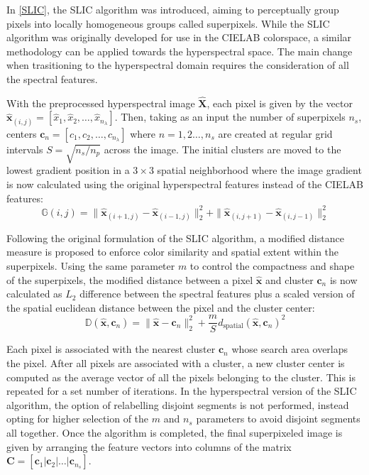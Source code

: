 In \ref{SLIC}, the SLIC algorithm was introduced, aiming to perceptually group pixels into locally homogeneous groups called superpixels. While the SLIC algorithm was originally developed for use in the CIELAB colorspace, a similar methodology can be applied towards the hyperspectral space. The main change when trasitioning to the hyperspectral domain requires the consideration of all the spectral features.

With the preprocessed hyperspectral image $\hat{\mathbf{X}}$, each pixel is given by the vector $\hat{\mathbf{x}}_{(i,j)} = [\hat{x}_1, \hat{x}_2, \dots, \hat{x}_{n_\lambda}]$. Then, taking as an input the number of superpixels $n_s$, centers $\mathbf{c}_n = [c_1, c_2, \dots, c_{n_\lambda}]$ where $n = 1, 2 \dots, n_s$ are created at regular grid intervals $S = \sqrt{n_s/n_p}$ across the image. The initial clusters are moved to the lowest gradient position in a $3 \times 3$ spatial neighborhood where the image gradient is now calculated using the original hyperspectral features instead of the CIELAB features: 
\begin{equation}
    \label{eq:slic-gradient-2}
    \mathbb{G}(i,j) = \|\hat{\mathbf{x}}_{(i+1,j)} - \hat{\mathbf{x}}_{(i-1,j)} \|_2^2 + \|\hat{\mathbf{x}}_{(i,j+1)} - \hat{\mathbf{x}}_{(i,j-1)} \|_2^2
\end{equation}

Following the original formulation of the SLIC algorithm, a modified distance measure is proposed to enforce color similarity and spatial extent within the superpixels. Using the same parameter $m$ to control the compactness and shape of the superpixels, the modified distance between a pixel $\hat{\mathbf{x}}$ and cluster $\mathbf{c}_n$ is now calculated as $L_2$ difference between the spectral features plus a scaled version of the spatial euclidean distance between the pixel and the cluster center:
\begin{equation}
    \label{eq:slic-cielab-distance-hsi}
    \mathbb{D}(\hat{\mathbf{x}}, \mathbf{c}_n) = \|\hat{\mathbf{x}} - \mathbf{c}_n\|_2^2 + \frac{m}{S}d_{\text{spatial}}(\hat{\mathbf{x}}, \mathbf{c}_n)^2
\end{equation}

Each pixel is associated with the nearest cluster $\mathbf{c}_n$ whose search area overlaps the pixel. After all pixels are associated with a cluster, a new cluster center is computed as the average vector of all the pixels belonging to the cluster. This is repeated for a set number of iterations. In the hyperspectral version of the SLIC algorithm, the option of relabelling disjoint segments is not performed, instead opting for higher selection of the $m$ and $n_s$ parameters to avoid disjoint segments all together. Once the algorithm is completed, the final superpixeled image is given by arranging the feature vectors into columns of the matrix $\mathbf{C} = [\mathbf{c}_1 | \mathbf{c}_2 | \dots | \mathbf{c}_{n_s}]$. 

